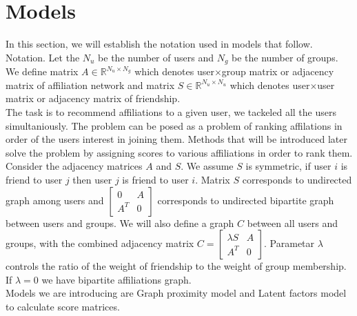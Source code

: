 \documentclass[twoside,twocolumn]{article}
\begin{document}

\section{Models}
In this section, we will establish the notation used in models that follow. \\
Notation. Let the $N_u$ be the number of users and $N_g$ be the number of groups. We define matrix $A \in \mathbb{R}^{N_u \times N_g}$ which denotes user$\times$group matrix or adjacency matrix of affiliation network and matrix $S \in \mathbb{R}^{N_u \times N_u}$ which denotes user$\times$user matrix or adjacency matrix of friendship. \\

The task is to recommend affiliations to a given user, we tackeled all the users simultaniously. The problem can be posed as a problem of ranking affilations in order of the users interest in joining them. Methods that will be introduced later solve the problem by assigning scores to various affiliations in order to rank them. \\

Consider the adjacency matrices $A$ and $S$. We assume $S$ is symmetric, if user $i$ is friend to user $j$ then user $j$ is friend to user $i$. Matrix $S$ corresponds to undirected graph among users and $\begin{bmatrix} 	0 & A\\ 	A^T & 0 \end{bmatrix}$ corresponds to undirected bipartite graph between users and groups. We will also define a graph $C$ between all users and groups, with the combined adjacency matrix  $ C= \begin{bmatrix} 	\lambda S & A\\ 	A^T & 0 \end{bmatrix}$. Parametar $\lambda$ controls the ratio of the weight of friendship to the weight of group membership. If $\lambda = 0$ we have bipartite affiliations graph. \\

Models we are introducing are Graph proximity model and Latent factors model to calculate score matrices. 
\end{document}
